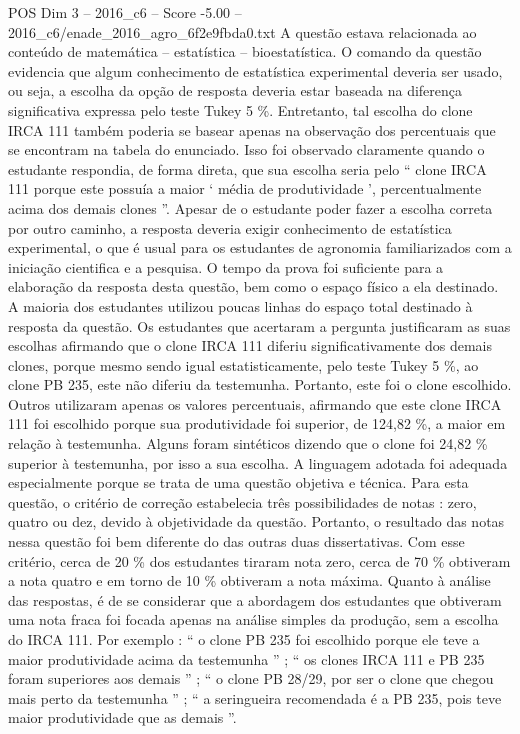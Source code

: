 \begin{textsample}{POS Dim 3 – 2016\_c6 – Score -5.00 – 2016\_c6/enade\_2016\_agro\_6f2e9fbda0.txt}
A questão estava relacionada ao conteúdo de matemática – estatística – bioestatística.
O comando da questão evidencia que algum conhecimento de estatística experimental deveria ser usado, ou seja, a escolha da opção de resposta deveria estar baseada na diferença significativa expressa pelo teste Tukey 5 \%.
Entretanto, tal escolha do clone IRCA 111 também poderia se basear apenas na observação dos percentuais que se encontram na tabela do enunciado.
Isso foi observado claramente quando o estudante respondia, de forma direta, que sua escolha seria pelo “ clone IRCA 111 porque este possuía a maior ‘ média de produtividade ’, percentualmente acima dos demais clones ”.
Apesar de o estudante poder fazer a escolha correta por outro caminho, a resposta deveria exigir conhecimento de estatística experimental, o que é usual para os estudantes de agronomia familiarizados com a iniciação cientifica e a pesquisa.
O tempo da prova foi suficiente para a elaboração da resposta desta questão, bem como o espaço físico a ela destinado.
A maioria dos estudantes utilizou poucas linhas do espaço total destinado à resposta da questão.
Os estudantes que acertaram a pergunta justificaram as suas escolhas afirmando que o clone IRCA 111 diferiu significativamente dos demais clones, porque mesmo sendo igual estatisticamente, pelo teste Tukey 5 \%, ao clone PB 235, este não diferiu da testemunha.
Portanto, este foi o clone escolhido.
Outros utilizaram apenas os valores percentuais, afirmando que este clone IRCA 111 foi escolhido porque sua produtividade foi superior, de 124,82 \%, a maior em relação à testemunha.
Alguns foram sintéticos dizendo que o clone foi 24,82 \% superior à testemunha, por isso a sua escolha.
A linguagem adotada foi adequada especialmente porque se trata de uma questão objetiva e técnica.
Para esta questão, o critério de correção estabelecia três possibilidades de notas : zero, quatro ou dez, devido à objetividade da questão.
Portanto, o resultado das notas nessa questão foi bem diferente do das outras duas dissertativas.
Com esse critério, cerca de 20 \% dos estudantes tiraram nota zero, cerca de 70 \% obtiveram a nota quatro e em torno de 10 \% obtiveram a nota máxima.
Quanto à análise das respostas, é de se considerar que a abordagem dos estudantes que obtiveram uma nota fraca foi focada apenas na análise simples da produção, sem a escolha do IRCA 111.
Por exemplo : “ o clone PB 235 foi escolhido porque ele teve a maior produtividade acima da testemunha ” ; “ os clones IRCA 111 e PB 235 foram superiores aos demais ” ; “ o clone PB 28/29, por ser o clone que chegou mais perto da testemunha ” ; “ a seringueira recomendada é a PB 235, pois teve maior produtividade que as demais ”.

\end{textsample}

